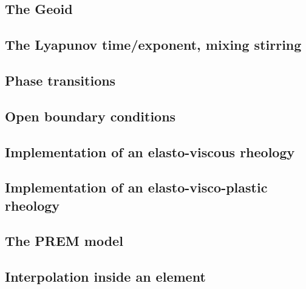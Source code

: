 \subsection{The Geoid} \label{ss:geoid}  %
\newpage %
\subsection{The Lyapunov time/exponent, mixing stirring}\label{ss:lyapunov} %
\newpage %
\subsection{Phase transitions}\label{ss:phasetransitions} %
\newpage %
\subsection{Open boundary conditions}\label{ss:openbc} %
\newpage %
\subsection{Implementation of an elasto-viscous rheology} \label{ss:evrheo}  %
\newpage %
\subsection{Implementation of an elasto-visco-plastic rheology}\label{ss:evprheo} %
\newpage %
\subsection{The PREM model} \label{ss:prem}  %
\newpage %
\subsection{Interpolation inside an element} \label{ss:bern}  %
\newpage %
